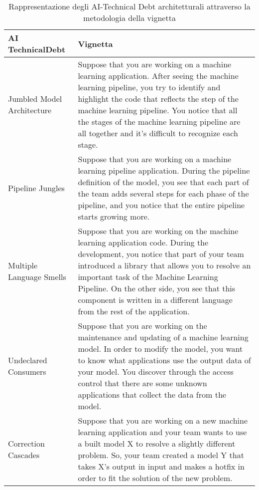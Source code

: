 \begin{table}[h!]
    \centering
    \scriptsize
    \begin{tabular}{|l|p{6cm}|}
    \hline
        \textbf{AI TechnicalDebt} & \textbf{Vignetta}\\
        \hline
         Jumbled Model Architecture & Suppose that you are working on a machine learning application. After seeing the machine learning pipeline, you try to identify and highlight the code that reflects the step of the machine learning pipeline. You notice that all the stages of the machine learning pipeline are all together and it’s difficult to recognize each stage.\\
             \hline
         Pipeline Jungles & Suppose that you are working on a machine learning pipeline application. During the pipeline definition of the model, you see that each part of the team adds several steps for each phase of the pipeline, and you notice that the entire pipeline starts growing more.\\
             \hline
         Multiple Language Smells & Suppose that you are working on the machine learning application code. During the development, you notice that part of your team introduced a library that allows you to resolve an important task of the Machine Learning Pipeline. On the other side, you see that this component is written in a different language from the rest of the application.\\
             \hline
         Undeclared Consumers & Suppose that you are working on the maintenance and updating of a machine learning model. In order to modify the model, you want to know what applications use the output data of your model. You discover through the access control that there are some unknown applications that collect the data from the model.\\
             \hline
         Correction Cascades & Suppose that you are working on a new machine learning application and your team wants to use a built model X to resolve a slightly different problem. So, your team created a model Y that takes X's output in input and makes a hotfix in order to fit the solution of the new problem.\\
             \hline
    \end{tabular}
    \caption{Rappresentazione degli AI-Technical Debt architetturali attraverso la metodologia della vignetta}
    \label{tab:aitd_a_vignetta}
\end{table}


